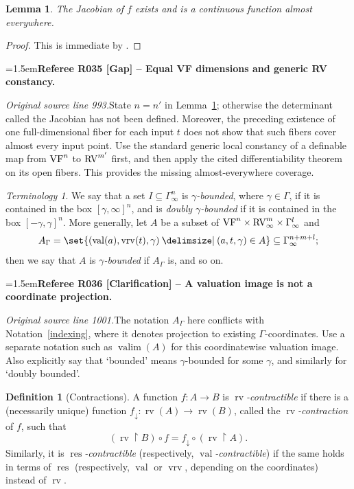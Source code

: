 \documentclass[12pt]{amsart}
\newcommand{\RefereeRemark}[4]{%
  \par\medskip\begingroup\normalfont\small\color{RefereePurple}%
  \emergencystretch=1.5em\noindent\textbf{Referee R#1 [#2] -- #3.}\par\nobreak\noindent #4\par
  \endgroup\medskip
}
\newcommand{\memph}[1]{{\color{magenta}\emph{#1}}}
\theoremstyle{plain}
\newtheorem{lem}[thm]{Lemma}
\theoremstyle{definition}
\newtheorem{defn}[thm]{Definition}
\theoremstyle{remark}
\newtheorem{ter}[thm]{Terminology}
\numberwithin{equation}{section}
\theoremstyle{plain}
\newcommand{\VF}{\textup{VF}}
\newcommand{\RV}{\textup{RV}}
\DeclareMathOperator{\res}{res}  %
\newcommand{\0}{\emptyset}
\newcommand{\rest}{\upharpoonright}
\newcommand{\fun}{\longrightarrow}
\newcommand{\sub}{\subseteq}
\providecommand\given{}
\newcommand\SetSymbol[1][]{%
\nonscript \: #1 \vert
\allowbreak
\nonscript\:
\mathopen{}}
\renewcommand\given{\SetSymbol[\delimsize]}
\DeclareMathOperator{\rv}{rv}
\DeclareMathOperator{\vv}{val}
\DeclareMathOperator{\vrv}{vrv}
\begin{document}
\begin{lem}\label{diff:almost:every}
The Jacobian of $f$  exists and is a continuous function almost everywhere.
\end{lem}
\begin{proof}
This is immediate by \cite[Corollary~9.9]{Yin:special:trans}.
\end{proof}

\RefereeRemark{035}{Gap}{Equal VF dimensions and generic RV constancy}{%
\textit{Original source line 993.}\quad State $n=n'$ in Lemma~\ref{diff:almost:every}; otherwise the determinant called the Jacobian has not been defined. Moreover, the preceding existence of one full-dimensional fiber for each input $t$ does not show that such fibers cover almost every input point. Use the standard generic local constancy of a definable map from $\VF^n$ to $\RV^{m'}$ first, and then apply the cited differentiability theorem on its open fibers. This provides the missing almost-everywhere coverage.
}

\begin{ter}\label{bounded}
We say that a set $I \sub \Gamma_{\infty}^n$ is \memph{$\gamma$-bounded}, where $\gamma \in \Gamma$, if it is contained in the box $[\gamma, \infty]^n$, and is \memph{doubly $\gamma$-bounded} if it is contained in the box $[-\gamma, \gamma]^n$. More generally, let $A$ be a subset of $\VF^n \times \RV_\infty^m \times \Gamma_\infty^l$ and
\[
A_{\Gamma} = \set{(\vv(a), \vrv(t), \gamma) \given (a, t, \gamma) \in A} \sub \Gamma_{\infty}^{n+m+l};
\]
then we say that $A$ is \memph{$\gamma$-bounded} if $A_{\Gamma}$ is, and so on.
\end{ter}

\RefereeRemark{036}{Clarification}{A valuation image is not a coordinate projection}{%
\textit{Original source line 1001.}\quad The notation $A_\Gamma$ here conflicts with Notation~\ref{indexing}, where it denotes projection to existing $\Gamma$-coordinates. Use a separate notation such as $\operatorname{valim}(A)$ for this coordinatewise valuation image. Also explicitly say that `bounded' means $\gamma$-bounded for some $\gamma$, and similarly for `doubly bounded'.
}

\begin{defn}[Contractions]\label{defn:corr:cont}
A function $f : A \fun B$ is \memph{$\rv$-contractible} if there is a (necessarily unique) function $f_{\downarrow} : \rv(A) \fun \rv(B)$, called the \memph{$\rv$-contraction} of $f$, such that
\[
(\rv \rest B) \circ f = f_{\downarrow} \circ (\rv \rest A).
\]
Similarly, it is \memph{$\res$-contractible} (respectively, \memph{$\vv$-contractible}) if the same holds in terms of $\res$ (respectively, $\vv$ or $\vrv$, depending on the coordinates) instead of $\rv$.
\end{defn}
\end{document}
